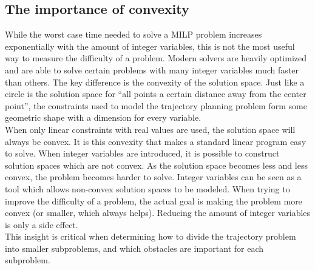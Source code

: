 \subsection{The importance of convexity}
While the worst case time needed to solve a MILP problem increases exponentially with the amount of integer variables, this is not the most useful way to measure the difficulty of a problem. Modern solvers are heavily optimized and are able to solve certain problems with many integer variables much faster than others. The key difference is the convexity of the solution space. Just like a circle is the solution space for ``all points a certain distance away from the center point'', the constraints used to model the trajectory planning problem form some geometric shape with a dimension for every variable. \\
When only linear constraints with real values are used, the solution space will always be convex. It is this convexity that makes a standard linear program easy to solve. When integer variables are introduced, it is possible to construct solution spaces which are not convex. As the solution space becomes less and less convex, the problem becomes harder to solve. Integer variables can be seen as a tool which allows non-convex solution spaces to be modeled. When trying to improve the difficulty of a problem, the actual goal is making the problem more convex (or smaller, which always helps). Reducing the amount of integer variables is only a side effect. \\
This insight is critical when determining how to divide the trajectory problem into smaller subproblems, and which obstacles are important for each subproblem.

